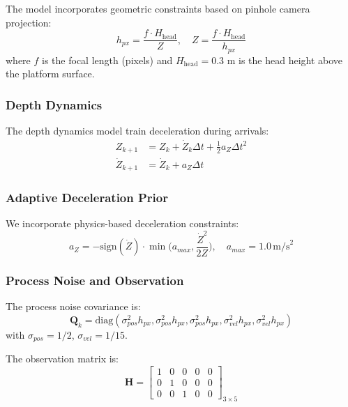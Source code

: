 The model incorporates geometric constraints based on pinhole camera projection:
\begin{equation}
h_{px} = \frac{f \cdot H_{\mathrm{head}}}{Z}, \quad Z = \frac{f \cdot H_{\mathrm{head}}}{h_{px}}
\label{eq:geometric_constraints}
\end{equation}
where $f$ is the focal length (pixels) and $H_{\mathrm{head}}=0.3$ m is the head height above the platform surface.

\subsubsection{Depth Dynamics}

The depth dynamics model train deceleration during arrivals:
\begin{align}
Z_{k+1} &= Z_k + \dot{Z}_k \Delta t + \tfrac{1}{2}a_Z \Delta t^2 \\
\dot{Z}_{k+1} &= \dot{Z}_k + a_Z \Delta t
\end{align}

\subsubsection{Adaptive Deceleration Prior}

We incorporate physics-based deceleration constraints:
\begin{equation}
a_Z = -\text{sign}(\dot{Z}) \cdot \min\Big(a_{max}, \frac{\dot{Z}^2}{2Z}\Big), \quad a_{max} = 1.0\,\text{m/s}^2
\end{equation}

\subsubsection{Process Noise and Observation}

The process noise covariance is:
\begin{equation}
\mathbf{Q}_k = \text{diag}(\sigma_{pos}^2 h_{px}, \sigma_{pos}^2 h_{px}, \sigma_{pos}^2 h_{px}, \sigma_{vel}^2 h_{px}, \sigma_{vel}^2 h_{px})
\end{equation}
with $\sigma_{pos} = 1/2$, $\sigma_{vel} = 1/15$.

The observation matrix is:
\begin{equation}
\mathbf{H} = \begin{bmatrix}
1 & 0 & 0 & 0 & 0 \\
0 & 1 & 0 & 0 & 0 \\
0 & 0 & 1 & 0 & 0
\end{bmatrix}_{3 \times 5}
\end{equation}

